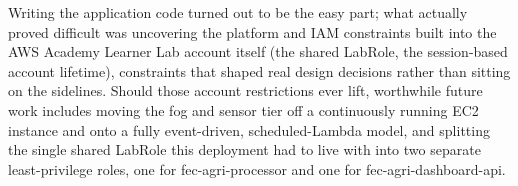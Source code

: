 \documentclass[conference]{IEEEtran}
\begin{document}
Writing the application code turned out to be the easy part; what actually proved difficult was uncovering the platform and IAM constraints built into the AWS Academy Learner Lab account itself (the shared LabRole, the session-based account lifetime), constraints that shaped real design decisions rather than sitting on the sidelines. Should those account restrictions ever lift, worthwhile future work includes moving the fog and sensor tier off a continuously running EC2 instance and onto a fully event-driven, scheduled-Lambda model, and splitting the single shared LabRole this deployment had to live with into two separate least-privilege roles, one for fec-agri-processor and one for fec-agri-dashboard-api.



\end{document}
